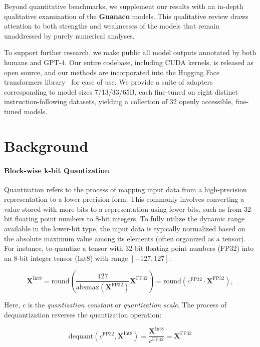 Beyond quantitative benchmarks, we supplement our results with an in-depth qualitative examination of the \textbf{Guanaco} models. This qualitative review draws attention to both strengths and weaknesses of the models that remain unaddressed by purely numerical analyses.

To support further research, we make public all model outputs annotated by both humans and GPT-4. Our entire codebase, including CUDA kernels, is released as open source, and our methods are incorporated into the Hugging Face transformers library~\citep{wolf2019huggingface} for ease of use. We provide a suite of adapters corresponding to model sizes 7/13/33/65B, each fine-tuned on eight distinct instruction-following datasets, yielding a collection of 32 openly accessible, fine-tuned models.

\section{Background}
\paragraph{Block-wise k-bit Quantization} Quantization refers to the process of mapping input data from a high-precision representation to a lower-precision form. This commonly involves converting a value stored with more bits to a representation using fewer bits, such as from 32-bit floating point numbers to 8-bit integers. To fully utilize the dynamic range available in the lower-bit type, the input data is typically normalized based on the absolute maximum value among its elements (often organized as a tensor). For instance, to quantize a tensor with 32-bit floating point numbers (FP32) into an 8-bit integer tensor (Int8) with range $[-127, 127]$:

\begin{equation}
    \mathbf{X}^{ \text{Int8}} = \text{round}\left( \frac{127}{{\text{absmax}}(\mathbf{X}^{{\text{FP32}}})}\mathbf{X}^{{\text{FP32}}} \right) = \text{round}(c^{\text{FP32}}\cdot \mathbf{X}^{{\text{FP32}}}),
\end{equation}

Here, $c$ is the {\em quantization constant} or {\em quantization scale}. The process of dequantization reverses the quantization operation:

\begin{equation}
    \text{dequant}(c^{\text{FP32}}, \mathbf{X}^{\text{Int8}}) = \frac{\mathbf{X}^{\text{Int8}}}{c^{\text{FP32}}} = \mathbf{X}^{\text{FP32}}
\end{equation}

